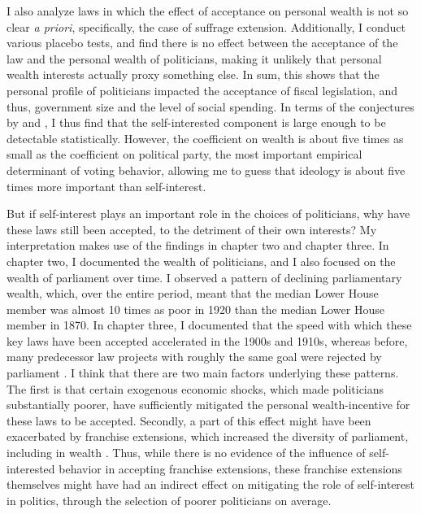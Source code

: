 I also analyze laws in which the effect of acceptance on personal wealth is not so clear \textit{a priori}, specifically, the case of suffrage extension. Additionally, I conduct various placebo tests, and find there is no effect between the acceptance of the law and the personal wealth of politicians, making it unlikely that personal wealth interests actually proxy something else. In sum, this shows that the personal profile of politicians impacted the acceptance of fiscal legislation, and thus, government size and the level of social spending. In terms of the conjectures by \cite{tahoun2019personal} and \cite{grossman1996electoral}, I thus find that the self-interested component is large enough to be detectable statistically. However, the coefficient on wealth is about five times as small as the coefficient on political party, the most important empirical determinant of voting behavior, allowing me to guess that ideology is about five times more important than self-interest. 

But if self-interest plays an important role in the choices of politicians, why have these laws still been accepted, to the detriment of their own interests? My interpretation makes use of the findings in chapter two and chapter three. In chapter two, I documented the wealth of politicians, and I also focused on the wealth of parliament over time. I observed a pattern of declining parliamentary wealth, which, over the entire period, meant that the median Lower House member was almost 10 times as poor in 1920 than the median Lower House member in 1870. In chapter three, I documented that the speed with which these key laws have been accepted accelerated in the 1900s and 1910s, whereas before, many predecessor law projects with roughly the same goal were rejected by parliament \citep{smit2002omwille, van2013eerste}. I think that there are two main factors underlying these patterns. The first is that certain exogenous economic shocks, which made politicians substantially poorer, have sufficiently mitigated the personal wealth-incentive for these laws to be accepted. Secondly, a part of this effect might have been exacerbated by franchise extensions, which increased the diversity of parliament, including in wealth \citep{van1983toegang}. Thus, while there is no evidence of the influence of self-interested behavior in accepting franchise extensions, these franchise extensions themselves might have had an indirect effect on mitigating the role of self-interest in politics, through the selection of poorer politicians on average.

